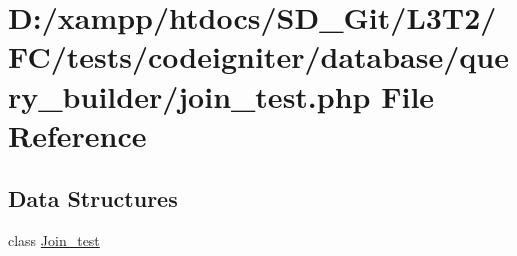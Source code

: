 \hypertarget{tests_2codeigniter_2database_2query__builder_2join__test_8php}{}\section{D\+:/xampp/htdocs/\+S\+D\+\_\+\+Git/\+L3\+T2/\+F\+C/tests/codeigniter/database/query\+\_\+builder/join\+\_\+test.php File Reference}
\label{tests_2codeigniter_2database_2query__builder_2join__test_8php}
\subsection*{Data Structures}
\begin{DoxyCompactItemize}
\item 
class \hyperlink{class_join__test}{Join\+\_\+test}
\end{DoxyCompactItemize}
